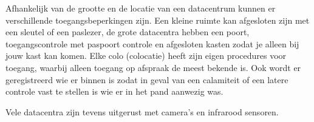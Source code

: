 Afhankelijk van de grootte en de locatie van een datacentrum kunnen er verschillende toegangsbeperkingen zijn. Een kleine ruimte kan afgesloten zijn met een sleutel of een paslezer, de grote datacentra hebben een poort, toegangscontrole met paspoort controle en afgesloten kasten zodat je alleen bij jouw kast kan komen. Elke colo (colocatie) heeft zijn eigen procedures voor toegang, waarbij alleen toegang op afspraak de meest bekende is. Ook wordt er geregistreerd wie er binnen is zodat in geval van een calamiteit of een latere controle vast te stellen is wie er in het pand aanwezig was.

Vele datacentra zijn tevens uitgerust met camera's en infrarood sensoren.
